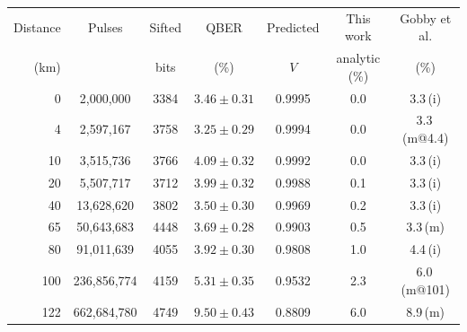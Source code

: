 %
%
%
%
\begin{tabular}{rcccccc}
  Distance & Pulses & Sifted & QBER & Predicted & This work & Gobby et al. \\
  (km)     &        & bits   & (\%) & $V$ & analytic (\%) & (\%) \\
\hline
  0 & 2,000,000 & 3384 & $3.46 \pm 0.31$ & 0.9995 & 0.0 & 3.3\,(i) \\
  4 & 2,597,167 & 3758 & $3.25 \pm 0.29$ & 0.9994 & 0.0 & 3.3\,(m@4.4) \\
  10 & 3,515,736 & 3766 & $4.09 \pm 0.32$ & 0.9992 & 0.0 & 3.3\,(i) \\
  20 & 5,507,717 & 3712 & $3.99 \pm 0.32$ & 0.9988 & 0.1 & 3.3\,(i) \\
  40 & 13,628,620 & 3802 & $3.50 \pm 0.30$ & 0.9969 & 0.2 & 3.3\,(i) \\
  65 & 50,643,683 & 4448 & $3.69 \pm 0.28$ & 0.9903 & 0.5 & 3.3\,(m) \\
  80 & 91,011,639 & 4055 & $3.92 \pm 0.30$ & 0.9808 & 1.0 & 4.4\,(i) \\
  100 & 236,856,774 & 4159 & $5.31 \pm 0.35$ & 0.9532 & 2.3 & 6.0\,(m@101) \\
  122 & 662,684,780 & 4749 & $9.50 \pm 0.43$ & 0.8809 & 6.0 & 8.9\,(m) \\
\end{tabular}
%
